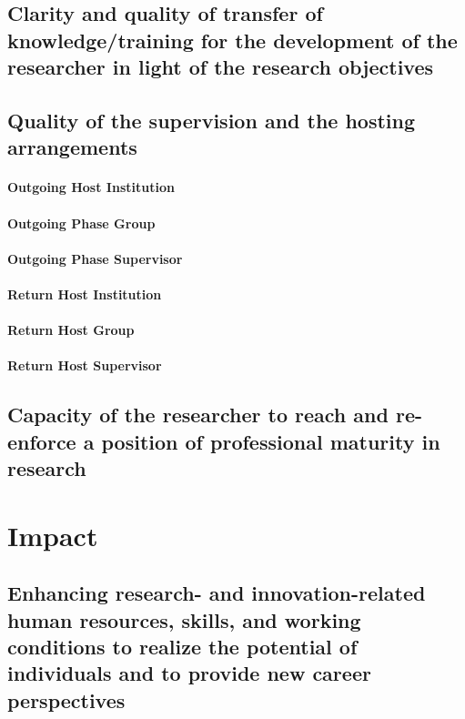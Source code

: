 \documentclass{article}[11pt]
\begin{document}
\subsection{Clarity and quality of transfer of knowledge/training for the development of the researcher in light of the research objectives}

\subsection{Quality of the supervision and the hosting arrangements}
\paragraph{Outgoing Host Institution}
\paragraph{Outgoing Phase Group}
\paragraph{Outgoing Phase Supervisor}
\paragraph{Return Host Institution}
\paragraph{Return Host Group}
\paragraph{Return Host Supervisor}


\subsection{Capacity of the researcher to reach and re-enforce a position of professional maturity in research}



\section{Impact}
\subsection{Enhancing research- and innovation-related human resources, skills, and working conditions to realize the potential of individuals and to provide new career perspectives}
\end{document}
